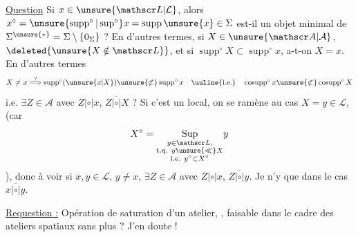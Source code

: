 \uline{Question} Si $x\in\unsure{\mathscr L|\mathcal L}$, alors $x^\circ=\unsure{\operatorname{supp}^\circ|\operatorname{sup}^\circ} x=\operatorname{supp}\unsure{x}\in\Sigma$ est-il un objet minimal de $\Sigma^{\unsure{*}}=\Sigma\setminus\{0_\Sigma\}$ ? En d'autres termes, si $X\in\unsure{\mathscr A|\mathcal A}$, $\deleted{\unsure{X\notin\mathscr L}}$, et si $\operatorname{supp}^\circ X\subset\operatorname{supp}^\circ x$, a-t-on $X=x$. En d'autres termes
\[
X\ne x\overset{?}{\Longrightarrow}\operatorname{supp}^\circ(\unsure{x|X})\unsure{\not\subset}\operatorname{supp}^\circ x
\quad\text{\uuline{i.e.}}\quad
\operatorname{cosupp}^\circ x\unsure{\not\subset}\operatorname{cosupp}^\circ X
\]
i.e. $\exists Z\in\mathscr A$ avec $Z|\circ|x$, $Z\overline{|\circ|}X$ ? Si c'est un local, on se ramène au cas $X=y\in\mathscr L$, (car
\[
X^\circ=\underset{\substack{y\in\mathscr L,\\\text{t.q. }y\unsure{\ll}X\\\text{i.e. }y^\circ\subset X^\circ}}{\operatorname{Sup}}y
\]
), donc à voir si $x,y\in\mathscr L$, $y\ne x$, $\exists Z\in\mathscr A$ avec $Z|\circ|x$, $Z\overline{|\circ|}y$. Je n'y  que dans le cas $x\overline{|\circ|}y$.

\uline{Requestion :} Opération de saturation d'un atelier, , faisable dans le cadre des ateliers spatiaux sans plus ? J'en doute !


